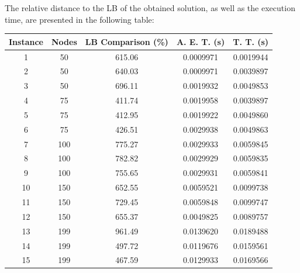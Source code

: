 \documentclass[10pt,twoside]{article}
\begin{document}
The relative distance to the LB of the obtained solution, as well as the execution time, are presented in the following table:
\begin{table}[H]
\centering
\begin{tabular}{ccccc}
\hline
\textbf{Instance} & \textbf{Nodes} & \textbf{LB Comparison (\%)} & \textbf{A. E. T. (s)} & \textbf{T. T. (s)} \\ \hline
1                 & 50             & 615.06                      & 0.0009971             & 0.0019944          \\
2                 & 50             & 640.03                      & 0.0009971             & 0.0039897          \\
3                 & 50             & 696.11                      & 0.0019932             & 0.0049853          \\
4                 & 75             & 411.74                      & 0.0019958             & 0.0039897          \\
5                 & 75             & 412.95                      & 0.0019922             & 0.0049860          \\
6                 & 75             & 426.51                      & 0.0029938             & 0.0049863          \\
7                 & 100            & 775.27                      & 0.0029933             & 0.0059845          \\
8                 & 100            & 782.82                      & 0.0029929             & 0.0059835          \\
9                 & 100            & 755.65                      & 0.0029931             & 0.0059841          \\
10                & 150            & 652.55                      & 0.0059521             & 0.0099738          \\
11                & 150            & 729.45                      & 0.0059848             & 0.0099747          \\
12                & 150            & 655.37                      & 0.0049825             & 0.0089757          \\
13                & 199            & 961.49                      & 0.0139620             & 0.0189488          \\
14                & 199            & 497.72                      & 0.0119676             & 0.0159561          \\
15                & 199            & 467.59                      & 0.0129933             & 0.0169566          \\

\end{tabular}
\end{table}
\end{document}
